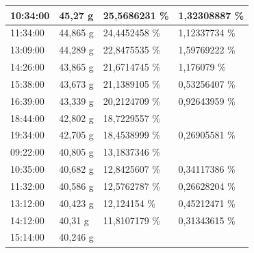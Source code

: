 \begin{table}[h]
\begin{tabular}{llll}
		\multicolumn{1}{|l|}{10:34:00} &
		\multicolumn{1}{l|}{45,27 g} &
		\multicolumn{1}{l|}{25,5686231   \%} &
		\multicolumn{1}{l|}{1,32308887 \%} \\ \hline
		\multicolumn{1}{|l|}{11:34:00} &
		\multicolumn{1}{l|}{44,865 g} &
		\multicolumn{1}{l|}{24,4452458   \%} &
		\multicolumn{1}{l|}{1,12337734 \%} \\ \hline
		\multicolumn{1}{|l|}{13:09:00} &
		\multicolumn{1}{l|}{44,289 g} &
		\multicolumn{1}{l|}{22,8475535   \%} &
		\multicolumn{1}{l|}{1,59769222 \%} \\ \hline
		\multicolumn{1}{|l|}{14:26:00} &
		\multicolumn{1}{l|}{43,865 g} &
		\multicolumn{1}{l|}{21,6714745   \%} &
		\multicolumn{1}{l|}{1,176079 \%} \\ \hline
		\multicolumn{1}{|l|}{15:38:00} &
		\multicolumn{1}{l|}{43,673 g} &
		\multicolumn{1}{l|}{21,1389105   \%} &
		\multicolumn{1}{l|}{0,53256407 \%} \\ \hline
		\multicolumn{1}{|l|}{16:39:00} &
		\multicolumn{1}{l|}{43,339 g} &
		\multicolumn{1}{l|}{\cellcolor[HTML]{00B0F0}20,2124709   \%} &
		\multicolumn{1}{l|}{0,92643959 \%} \\ \hline
		\multicolumn{1}{|l|}{18:44:00} &
		\multicolumn{1}{l|}{42,802 g} &
		\multicolumn{1}{l|}{18,7229557   \%} &
		\\ \hline
		\multicolumn{1}{|l|}{19:34:00} &
		\multicolumn{1}{l|}{42,705 g} &
		\multicolumn{1}{l|}{18,4538999   \%} &
		\multicolumn{1}{l|}{0,26905581 \%} \\ \hline
		\multicolumn{1}{|l|}{\cellcolor[HTML]{A5A5A5}09:22:00} &
		\multicolumn{1}{l|}{40,805 g} &
		\multicolumn{1}{l|}{13,1837346   \%} &
		\\ \hline
		\multicolumn{1}{|l|}{10:35:00} &
		\multicolumn{1}{l|}{40,682 g} &
		\multicolumn{1}{l|}{12,8425607   \%} &
		\multicolumn{1}{l|}{0,34117386 \%} \\ \hline
		\multicolumn{1}{|l|}{11:32:00} &
		\multicolumn{1}{l|}{40,586 g} &
		\multicolumn{1}{l|}{12,5762787   \%} &
		\multicolumn{1}{l|}{0,26628204 \%} \\ \hline
		\multicolumn{1}{|l|}{13:12:00} &
		\multicolumn{1}{l|}{40,423 g} &
		\multicolumn{1}{l|}{12,124154   \%} &
		\multicolumn{1}{l|}{0,45212471 \%} \\ \hline
		\multicolumn{1}{|l|}{14:12:00} &
		\multicolumn{1}{l|}{40,31 g} &
		\multicolumn{1}{l|}{11,8107179   \%} &
		\multicolumn{1}{l|}{0,31343615 \%} \\ \hline
		\multicolumn{1}{|l|}{15:14:00} &
		\multicolumn{1}{l|}{40,246 g} &

\end{tabular}
\end{table}
